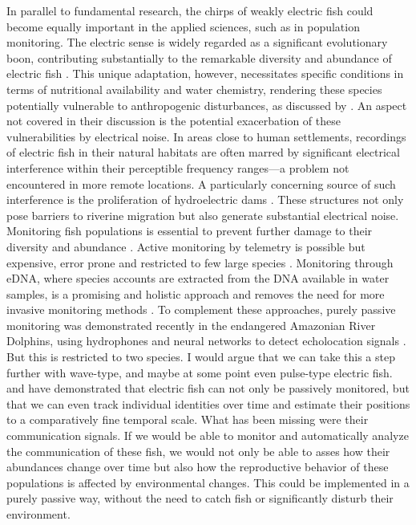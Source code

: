 In parallel to fundamental research, the chirps of weakly electric fish could
become equally important in the applied sciences, such as in population
monitoring. The electric sense is widely regarded as a significant evolutionary
boon, contributing substantially to the remarkable diversity and abundance of
electric fish \parencite{cramptonEvolutionElectricSignal2006}. This unique
adaptation, however, necessitates specific conditions in terms of nutritional
availability and water chemistry, rendering these species potentially
vulnerable to anthropogenic disturbances, as discussed by
\textcite{markhamEnergeticsSensingCommunication2016}. An aspect not covered in
their discussion is the potential exacerbation of these vulnerabilities by
electrical noise. In areas close to human settlements, recordings of electric
fish in their natural habitats are often marred by significant electrical
interference within their perceptible frequency ranges—a problem not
encountered in more remote locations. A particularly concerning source of such
interference is the proliferation of hydroelectric dams
\parencite{agostinhoAllThatGoes2011, keppelerEarlyImpactsLargest2022,
duponchelleConservationMigratoryFishes2021}. These structures not only pose
barriers to riverine migration but also generate substantial electrical noise.
Monitoring fish populations is essential to prevent further damage to their
diversity and abundance \parencite{larentisEffectsHumanDisturbance2022}. Active
monitoring by telemetry is possible but expensive, error prone and restricted
to few large species \parencite{hahnBiotelemetryRevealsMigratory2019}.
Monitoring through eDNA, where species accounts are extracted from the DNA
available in water samples, is a promising and holistic approach and removes
the need for more invasive monitoring methods
\parencite{desantanaCriticalRoleNatural2021}. To complement these approaches,
purely passive monitoring was demonstrated recently in the endangered Amazonian
River Dolphins, using hydrophones and neural networks to detect echolocation
signals \parencite{erbsAutomatedLongtermAcoustic2023}. But this is restricted
to two species. I would argue that we can take this a step further with
wave-type, and maybe at some point even pulse-type electric fish.
\textcite{henningerStatisticsNaturalCommunication2018} and
\textcite{madhavHighresolutionBehavioralMapping2018} have demonstrated that
electric fish can not only be passively monitored, but that we can even track
individual identities over time and estimate their positions to a comparatively
fine temporal scale. What has been missing were their communication signals. If
we would be able to monitor and automatically analyze the communication of
these fish, we would not only be able to asses how their abundances change over
time but also how the reproductive behavior of these populations is affected by
environmental changes. This could be implemented in a purely passive way,
without the need to catch fish or significantly disturb their environment.
 
